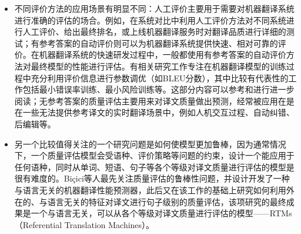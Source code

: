 \begin{itemize}
\vspace{0.5em}
\item 不同评价方法的应用场景有明显不同：人工评价主要用于需要对机器翻译系统进行准确的评估的场合。例如，在系统对比中利用人工评价方法对不同系统进行人工评价、给出最终排名，或上线机器翻译服务时对翻译品质进行详细的测试；有参考答案的自动评价则可以为机器翻译系统提供快速、相对可靠的评价。在机器翻译系统的快速研发过程中，一般都使用有参考答案的自动评价方法对最终模型的性能进行评估。有相关研究工作专注在机器翻译模型的训练过程中充分利用评价信息进行参数调优（如BLEU分数），其中比较有代表性的工作包括最小错误率训练、最小风险训练等。这部分内容可以参考{\chapterseven}和{\chapterthirteen}进行进一步阅读；无参考答案的质量评估主要用来对译文质量做出预测，经常被应用在是在一些无法提供参考译文的实时翻译场景中，例如人机交互过程、自动纠错、后编辑等。
\vspace{0.5em}
\item 另一个比较值得关注的一个研究问题是如何使模型更加鲁棒，因为通常情况下，一个质量评估模型会受语种、评价策略等问题的约束，设计一个能应用于任何语种，同时从单词、短语、句子等各个等级对译文质量进行评估的模型是很有难度的。Biçici等人最先关注质量评估的鲁棒性问题，并设计开发了一种与语言无关的机器翻译性能预测器，此后又在该工作的基础上研究如何利用外在的、与语言无关的特征对译文进行句子级别的质量评估，该项研究的最终成果是一个与语言无关，可以从各个等级对译文质量进行评估的模型——RTMs（Referential Translation Machines）。
\vspace{0.5em}
\end{itemize}
